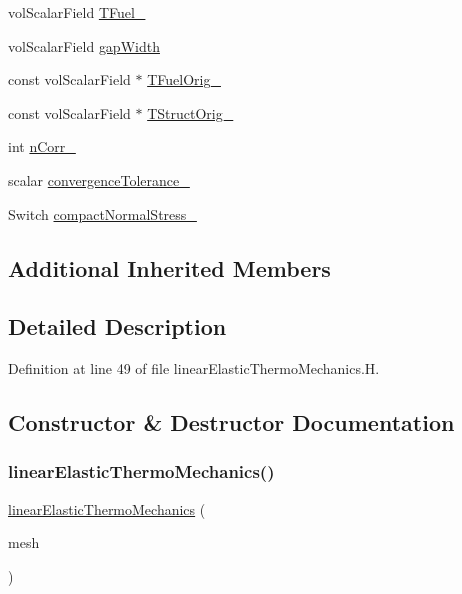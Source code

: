 \begin{DoxyCompactItemize}
vol\+Scalar\+Field \hyperlink{classFoam_1_1linearElasticThermoMechanics_a40daf0cf699f5ce2bea8554707d8e11d}{T\+Fuel\+\_\+}
\item 
vol\+Scalar\+Field \hyperlink{classFoam_1_1linearElasticThermoMechanics_ae8c9fa4e5d62247ec3885a7a1d67c371}{gap\+Width}
\item 
const vol\+Scalar\+Field $\ast$ \hyperlink{classFoam_1_1linearElasticThermoMechanics_a871434fb035f6837b1b236a1ec520abc}{T\+Fuel\+Orig\+\_\+}
\item 
const vol\+Scalar\+Field $\ast$ \hyperlink{classFoam_1_1linearElasticThermoMechanics_abbefccb2078842b86f95dccaa27cc5fb}{T\+Struct\+Orig\+\_\+}
\item 
int \hyperlink{classFoam_1_1linearElasticThermoMechanics_aa210185941914df447e1a5100532b08e}{n\+Corr\+\_\+}
\item 
scalar \hyperlink{classFoam_1_1linearElasticThermoMechanics_a7227b42db9d4c8c67cd1c159b252458d}{convergence\+Tolerance\+\_\+}
\item 
Switch \hyperlink{classFoam_1_1linearElasticThermoMechanics_aed5cfa5ed091df9944a6429bd42f5529}{compact\+Normal\+Stress\+\_\+}
\end{DoxyCompactItemize}
\subsection*{Additional Inherited Members}


\subsection{Detailed Description}


Definition at line 49 of file linear\+Elastic\+Thermo\+Mechanics.\+H.



\subsection{Constructor \& Destructor Documentation}
\mbox{\label{classFoam_1_1linearElasticThermoMechanics_a41128d2916888bb0d426332008b6ad17}} 
\subsubsection{\texorpdfstring{linear\+Elastic\+Thermo\+Mechanics()}{linearElasticThermoMechanics()}}
{\footnotesize\ttfamily \hyperlink{classFoam_1_1thermoMechanics_1_1linearElasticThermoMechanics}{linear\+Elastic\+Thermo\+Mechanics} (\begin{DoxyParamCaption}\item[{fv\+Mesh \&}]{mesh }\end{DoxyParamCaption})}



